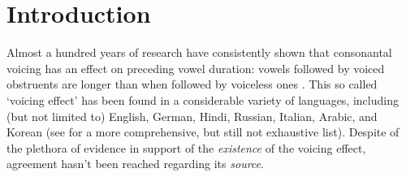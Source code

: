 \documentclass[preprint]{JASAnew}
\begin{document}

\maketitle




\hypertarget{introduction}{%
\section{Introduction}\label{introduction}}

\label{s:intro}

Almost a hundred years of research have consistently shown that
consonantal voicing has an effect on preceding vowel duration: vowels
followed by voiced obstruents are longer than when followed by voiceless
ones
\citep{heffner1937, house1953, belasco1953, peterson1960, halle1967, chen1970, klatt1973, lisker1974, raphael1975, javkin1976, maddieson1976, farnetani1986, kluender1988, laeufer1992, fowler1992, hussein1994, esposito2002, lampp2004, warren2005, durvasula2012}.
This so called `voicing effect' has been found in a considerable variety
of languages, including (but not limited to) English, German, Hindi,
Russian, Italian, Arabic, and Korean (see \citealt{maddieson1976} for a
more comprehensive, but still not exhaustive list). Despite of the
plethora of evidence in support of the \emph{existence} of the voicing
effect, agreement hasn't been reached regarding its \emph{source}.
\end{document}
